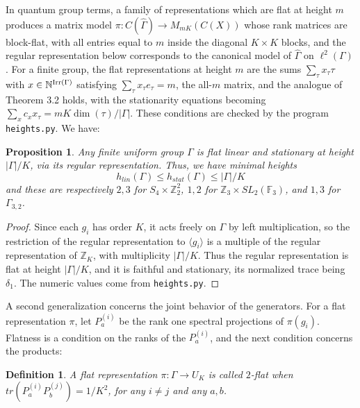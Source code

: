 \documentclass[12pt]{amsart}
\newtheorem{proposition}[theorem]{Proposition}
\newtheorem{definition}[theorem]{Definition}
\theoremstyle{definition}
\begin{document}
In quantum group terms, a family of representations which are flat at height $m$ produces a matrix model $\pi:C(\widehat{\Gamma})\to M_{mK}(C(X))$ whose rank matrices are block-flat, with all entries equal to $m$ inside the diagonal $K\times K$ blocks, and the regular representation below corresponds to the canonical model of $\widehat{\Gamma}$ on $\ell^2(\Gamma)$. For a finite group, the flat representations at height $m$ are the sums $\sum_\tau x_\tau\tau$ with $x\in\mathbb N^{{\rm Irr}(\Gamma)}$ satisfying $\sum_\tau x_\tau e_\tau=m$, the all-$m$ matrix, and the analogue of Theorem 3.2 holds, with the stationarity equations becoming $\sum_xc_xx_\tau=mK\dim(\tau)/|\Gamma|$. These conditions are checked by the program {\tt heights.py}. We have:

\begin{proposition}
Any finite uniform group $\Gamma$ is flat linear and stationary at height $|\Gamma|/K$, via its regular representation. Thus, we have minimal heights
$$h_{lin}(\Gamma)\leq h_{stat}(\Gamma)\leq|\Gamma|/K$$
and these are respectively $2,3$ for $S_4\times\mathbb Z_2^2$, $1,2$ for $\mathbb Z_3\times SL_2(\mathbb F_3)$, and $1,3$ for $\Gamma_{3,2}$.
\end{proposition}

\begin{proof}
Since each $g_i$ has order $K$, it acts freely on $\Gamma$ by left multiplication, so the restriction of the regular representation to $\langle g_i\rangle$ is a multiple of the regular representation of $\mathbb Z_K$, with multiplicity $|\Gamma|/K$. Thus the regular representation is flat at height $|\Gamma|/K$, and it is faithful and stationary, its normalized trace being $\delta_1$. The numeric values come from {\tt heights.py}.
\end{proof}

A second generalization concerns the joint behavior of the generators. For a flat representation $\pi$, let $P^{(i)}_a$ be the rank one spectral projections of $\pi(g_i)$. Flatness is a condition on the ranks of the $P^{(i)}_a$, and the next condition concerns the products:

\begin{definition}
A flat representation $\pi:\Gamma\to U_K$ is called $2$-flat when $tr(P^{(i)}_aP^{(j)}_b)=1/K^2$, for any $i\neq j$ and any $a,b$.
\end{definition}
\end{document}
